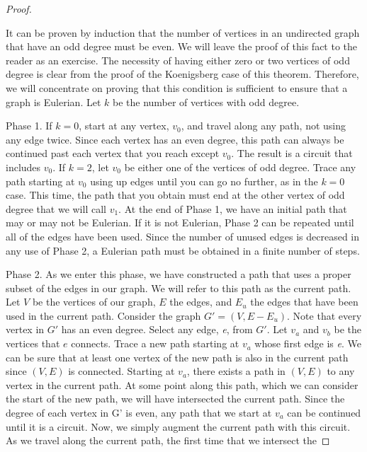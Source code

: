 \documentclass[10pt,]{book}
\theoremstyle{plain}
\theoremstyle{definition}
\theoremstyle{definition}
\theoremstyle{definition}
\theoremstyle{definition}
\theoremstyle{definition}
\numberwithin{equation}{section}
\begin{document}
\begin{proof}\hypertarget{proof-3}{}
It can be proven by induction that the number of vertices in an undirected graph that have an odd degree must be even. We will leave
the proof of this fact to the reader as an exercise. The necessity of having either zero or two vertices of odd degree is clear from the proof of
the Koenigsberg case of this theorem. Therefore, we will concentrate on proving that this condition is sufficient to ensure that a graph is Eulerian.
Let \(k\) be the number of vertices with odd degree.%
\par
 Phase 1. If \(k = 0\), start at any vertex, \(v_0\), and travel along any path, not using any edge twice. Since each vertex has an even
degree, this path can always be continued past each vertex that you reach except \(v_0\). The result is a circuit that includes \(v_0\). If \(k =
2\), let \(v_0\) be either one of the vertices of odd degree. Trace any path starting at \(v_0\) using up edges until you can go no further, as in
the \(k = 0\) case. This time, the path that you obtain must end at the other vertex of odd degree that we will call \(v_1\).  At the end of Phase
1, we have an initial path that may or may not be Eulerian. If it is not Eulerian, Phase 2 can be repeated until all of the edges have been used.
Since the number of unused edges is decreased in any use of Phase 2, a Eulerian path must be obtained in a finite number of steps.%
\par
 Phase 2. As we enter this phase, we have constructed a path that uses a proper subset of the edges in our graph. We will refer to this
path as the current path. Let \(V\) be the vertices of our graph, \(E\) the edges, and \(E_u\) the edges that have been used in the current
path. Consider the graph \(G' = \left(V, E - E_u\right)\).  Note that every vertex in \(G'\) has an even degree. Select any edge, \textit{
e}, from \(G'.\) Let \(v_a\) and \(v_b\) be the vertices that \(e\) connects. Trace a new path starting at \(v_a\) whose first edge is \textit{
e}. We can be sure that at least one vertex of the new path is also in the current path since \((V, E)\) is connected. Starting at \(v_a\), there
exists a path in \((V, E)\) to any vertex in the current path. At some point along this path, which we can consider the start of the new path, we
will have intersected the current path. Since the degree of each vertex in G' is even, any path that we start at \(v_a\) can be continued until it
is a circuit. Now, we simply augment the current path with this circuit. As we travel along the current path, the first time that we intersect the

\end{proof}
\end{document}

